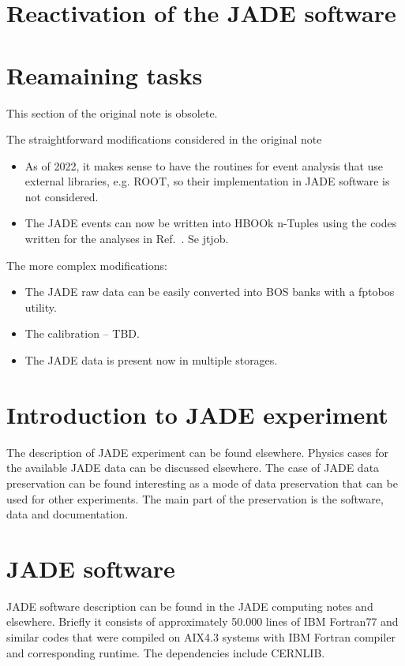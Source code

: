 \section{Reactivation of the JADE software}




\section{Reamaining tasks}
This section of the original note is obsolete.

The straightforward modifications considered in the original note
\begin{itemize}
\item As of 2022, it makes sense to
have the routines for event analysis that use external libraries, e.g. ROOT, so their 
implementation in JADE software is not considered.
\item The JADE events can now be written into HBOOk n-Tuples using the codes written 
for the analyses in Ref.~\cite{}. Se {\sc jtjob}.

\end{itemize}

The more complex modifications:


\begin{itemize}
\item The JADE raw data can be easily converted into BOS banks with a {\sc fptobos} utility.
\item The calibration -- TBD.
\item The JADE data is present now in multiple storages.
\end{itemize}


\section{Introduction to JADE experiment}
The description of JADE experiment can be found elsewhere.\cite{Bartel:1986ua}
Physics cases for the available JADE data can be discussed elsewhere\cite{Bartel:1986ua}.
The case of JADE data preservation can be found interesting as a mode of data preservation that can be used for other experiments.
The main part of the preservation is the  software, data and documentation.
\section{JADE software}
JADE software description can be found in the JADE computing notes and elsewhere.
Briefly it consists of approximately 50.000 lines of IBM Fortran77 and similar codes 
that were compiled on AIX4.3 systems with IBM Fortran compiler and corresponding runtime.
The dependencies include CERNLIB.


